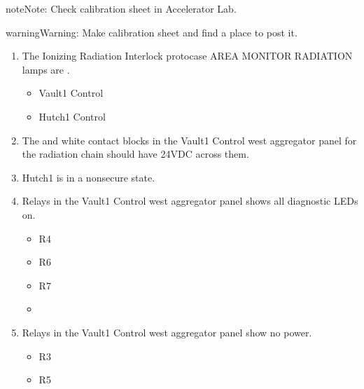 \documentclass[letterpaper,10pt,english]{sphinxmanual}
\begin{document}
\begin{sphinxadmonition}{note}{Note:}
\sphinxAtStartPar
Check calibration sheet in Accelerator Lab.
\end{sphinxadmonition}

\begin{sphinxadmonition}{warning}{Warning:}
\sphinxAtStartPar
Make calibration sheet and find a place to post it.
\end{sphinxadmonition}
\begin{enumerate}
%
\item {} 
\sphinxAtStartPar
The Ionizing Radiation Interlock protocase AREA MONITOR RADIATION lamps are .
\begin{itemize}
\item {} 
\sphinxAtStartPar
Vault\sphinxhyphen{}1 Control

\item {} 
\sphinxAtStartPar
Hutch\sphinxhyphen{}1 Control

\end{itemize}

\item {} 
\sphinxAtStartPar
The  and white contact blocks in the Vault\sphinxhyphen{}1 Control west aggregator panel for the radiation chain should have 24VDC across them.

\item {} 
\sphinxAtStartPar
Hutch\sphinxhyphen{}1 is in a non\sphinxhyphen{}secure state.

\item {} 
\sphinxAtStartPar
Relays in the Vault\sphinxhyphen{}1 Control west aggregator panel shows all diagnostic LEDs on.
\begin{itemize}
\item {} 
\sphinxAtStartPar
R4

\item {} 
\sphinxAtStartPar
R6

\item {} 
\sphinxAtStartPar
R7

\item {} 

\end{itemize}

\item {} 
\sphinxAtStartPar
Relays in the Vault\sphinxhyphen{}1 Control west aggregator panel show no power.
\begin{itemize}
\item {} 
\sphinxAtStartPar
R3

\item {} 
\sphinxAtStartPar
R5

\end{itemize}

\end{enumerate}
\end{document}
